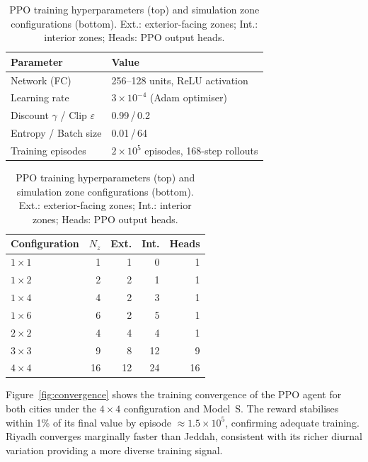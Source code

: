 \documentclass[12pt,a4paper]{article}
\begin{document}
\begin{table}[!t]
\setlength{\hfuzz}{6pt}
\caption{PPO training hyperparameters (top) and simulation zone configurations (bottom).
Ext.: exterior-facing zones; Int.: interior zones; Heads: PPO output heads.}
\label{tab:ppo}
\centering

\begin{subtable}{\columnwidth}
\setlength{\tabcolsep}{5pt}
\begin{tabularx}{\columnwidth}{@{}>{\raggedright\arraybackslash}X X@{}}
\toprule
\textbf{Parameter} & \textbf{Value} \\
\midrule
Network (FC)                 & 256--128 units, ReLU activation \\
Learning rate                & $3\times10^{-4}$ (Adam optimiser) \\
Discount $\gamma$ / Clip $\varepsilon$ & 0.99\,/\,0.2 \\
Entropy / Batch size         & 0.01\,/\,64 \\
Training episodes            & $2\times10^{5}$ episodes, 168-step rollouts \\
\bottomrule
\end{tabularx}
\end{subtable}

\vspace{8pt}

\begin{subtable}{\columnwidth}
\setlength{\tabcolsep}{5pt}
\begin{tabularx}{\columnwidth}{@{}Xrrrr@{}}
\toprule
\textbf{Configuration} & $N_z$ & \textbf{Ext.} & \textbf{Int.} & \textbf{Heads} \\
\midrule
$1\times1$ &  1 & 1 &  0 & 1 \\
$1\times2$ &  2 & 2 &  1 & 1 \\
$1\times4$ &  4 & 2 &  3 & 1 \\
$1\times6$ &  6 & 2 &  5 & 1 \\
$2\times2$ &  4 & 4 &  4 & 1 \\
$3\times3$ &  9 & 8 & 12 & 9 \\
$4\times4$ & 16 &12 & 24 &16 \\
\bottomrule
\end{tabularx}
\end{subtable}

\end{table}

Figure~\ref{fig:convergence} shows the training convergence of the PPO
agent for both cities under the $4\!\times\!4$ configuration and Model~S.
The reward stabilises within 1\% of its final value by episode
${\approx}1.5\times10^5$, confirming adequate training.
Riyadh converges marginally faster than Jeddah, consistent with its
richer diurnal variation providing a more diverse training signal.
\end{document}
